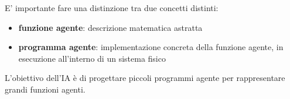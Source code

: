 \documentclass[12pt, a4paper, oneside]{book}
\begin{document}
    E' importante fare una distinzione tra due concetti distinti:
    \begin{itemize}
      \item \textbf{funzione agente}: descrizione matematica astratta
      \item \textbf{programma agente}: implementazione concreta della funzione agente, in esecuzione all'interno di un sistema fisico 
    \end{itemize}


    L'obiettivo dell'IA è di progettare piccoli programmi agente per rappresentare grandi funzioni agenti.
\end{document}

